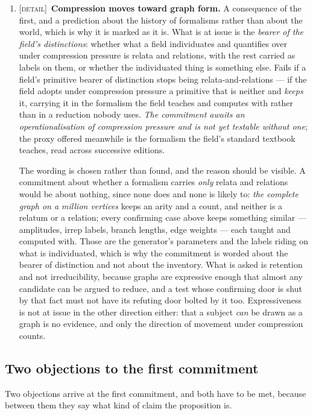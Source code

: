 \documentclass[11pt,a4paper]{article}
\begin{document}
\begin{enumerate}[leftmargin=*]
\item \textsc{[detail]}~\textbf{Compression moves toward graph form.} A consequence of the first, and a
prediction about the history of formalisms rather than about the world, which is why it is marked as it
is. What is at issue is the \emph{bearer of the field's distinctions}: whether
what a field individuates and quantifies over under compression pressure is relata and relations, with
the rest carried as labels on them, or whether the individuated thing is something else. Fails if a
field's primitive bearer of distinction stops being relata-and-relations --- if the field adopts under
compression pressure a primitive that is neither and \emph{keeps} it, carrying it in the formalism the
field teaches and computes with rather than in a reduction nobody uses. \emph{The commitment awaits an
operationalisation of \emph{compression pressure} and is not yet testable without one}; the proxy
offered meanwhile is the formalism the field's standard textbook teaches, read across successive
editions.

The wording is chosen rather than found, and the reason should be visible. A commitment about whether a
formalism carries \emph{only} relata and relations would be about nothing, since none does and none is
likely to: \emph{the complete graph on a million vertices} keeps an arity and a count, and neither is a
relatum or a relation; every confirming case above keeps something similar --- amplitudes, irrep
labels, branch lengths, edge weights --- each taught and computed with. Those are the generator's
parameters and the labels riding on what is individuated, which is why the commitment is worded about
the bearer of distinction and not about the inventory. What is asked is retention and not
irreducibility, because graphs are expressive enough that almost any candidate can be argued to reduce,
and a test whose confirming door is shut by that fact must not have its refuting door bolted by it too.
Expressiveness is not at issue in the other direction either: that a subject \emph{can} be drawn as a
graph is no evidence, and only the direction of movement under compression counts.
\end{enumerate}

\subsection*{Two objections to the first commitment}
Two objections arrive at the first commitment, and both have to be met, because between them they say
what kind of claim the proposition is.
\end{document}
